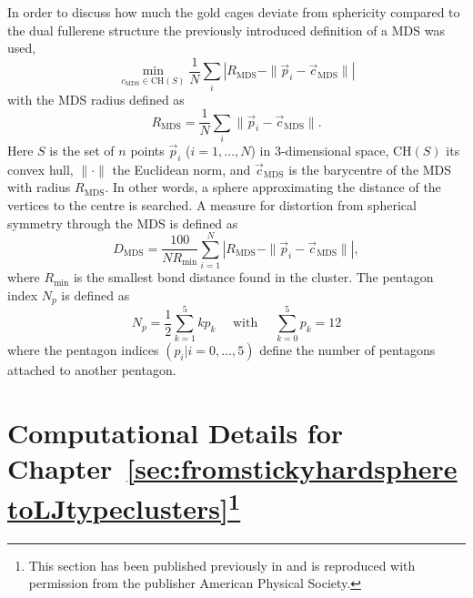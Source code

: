 In order to discuss how much the gold cages deviate from sphericity compared to
the dual fullerene structure the previously introduced definition of a \ac{MDS}
was used,\autocite{Schwerdtfeger_Programfullerenesoftware_2013}
%
\begin{equation} 
\min\limits_{c_\mathrm{MDS} \in \mathrm{CH}(S)} \frac{1}{N} \sum _{i} \left|R_\mathrm{MDS} -\| \vec{p}_{i}-\vec{c}_\mathrm{MDS} \| \right|  
\end{equation}
with the \ac{MDS} radius defined as
\begin{equation} 
	R_{\mathrm{MDS}} =\frac{1}{N} \sum _{i}\| \vec{p}_{i} -\vec{c}_{\mathrm{MDS}} \|. 
	\label{eq:RMDS}
\end{equation}
%
Here $S$ is the set of $n$ points $\vec{p}_i$ ($i=1,\ldots ,N$) in
$3$-dimensional space, $\mathrm{CH}(S)$ its convex hull, $\|\cdot\| $ the
Euclidean norm, and $\vec{c}_\mathrm{MDS}$ is the barycentre of the \ac{MDS}
with radius $R_\mathrm{MDS}$. In other words, a sphere approximating the
distance of the vertices to the centre is searched. A measure
for distortion from spherical symmetry through the
\ac{MDS} is defined as\autocite{Schwerdtfeger_Programfullerenesoftware_2013}
%
\begin{equation}
  \label{eq:DMDS}
  D_{\mathrm{MDS}} = \frac{100}{N R_\mathrm{min}} \sum_{i=1}^N \left|R_{\mathrm{MDS}} - \|\vec{p}_i - \vec{c}_{\mathrm{MDS}}\| \right|,
\end{equation}
where $R_\mathrm{min}$ is the smallest bond distance found in the cluster. The pentagon index $N_p$ is defined as
\begin{equation}
  \label{pentindex}
  N_p = \frac{1}{2}\sum_{k=1}^{5} kp_k \quad \text{ with } \quad  \sum_{k=0}^{5} p_k = 12
\end{equation}
%
where the pentagon indices $(p_i | i=0, \dots , 5)$ define the number of
pentagons attached to another pentagon.\autocite{Fowler-atlas-2006}

\section[Computational Details for
Chapter~\ref{sec:fromstickyhardspheretoLJtypeclusters}]{Computational Details
for Chapter~\ref{sec:fromstickyhardspheretoLJtypeclusters}\footnote{This
section has been published previously in
\autocite{Trombach_stickyhardsphereLennardJonestypeclusters_2018}
and is reproduced with permission from the publisher 
American Physical Society.} }


